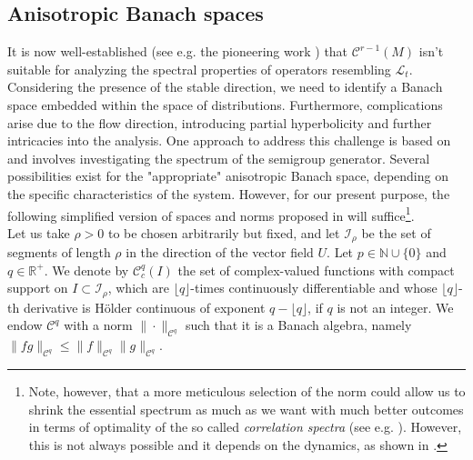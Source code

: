 \documentclass[11pt,letterpaper]{amsart}
\newcommand \cI {{\mathcal I}}
\newcommand \cL {{\mathcal L}}
\newcommand \R {{ \mathbb R}}
\newcommand \N {{ \mathbb N}}
\newcommand \cC {{\mathscr{C}}}
\theoremstyle{definition}
\begin{document}

\subsection{Anisotropic Banach spaces} It is now well-established (see e.g. the pioneering work \cite{BlKeLi}) that $\cC^{r-1}(M)$ isn't suitable for analyzing the spectral properties of operators resembling $ \cL_t$. Considering the presence of the stable direction, we need to identify a Banach space embedded within the space of distributions. Furthermore, complications arise due to the flow direction, introducing partial hyperbolicity and further intricacies into the analysis. One approach to address this challenge is based on \cite{Liv} and involves investigating the spectrum of the semigroup generator. Several possibilities exist for the "appropriate" anisotropic Banach space, depending on the specific characteristics of the system. However, for our present purpose, the following simplified version of spaces and norms proposed in \cite{GoLi} will suffice\footnote{Note, however, that a more meticulous selection of the norm could allow us to shrink the essential spectrum as much as we want with much better outcomes in terms of optimality of the so called {\textit{correlation spectra} (see e.g. \cite{BuLi})}. However, this is not always possible and it depends on the dynamics, as shown in \cite{BuCaCa, BuCaJa, BaCa}.}.\\

%
Let us take $\rho>0$ to be chosen arbitrarily but fixed, and let $\cI_\rho$ be the set of segments of length $\rho$ in the direction of the vector field $U$. Let $p\in \N \cup \{0\}$ and $q\in \R^+$. We denote by $\cC^{q}_c(I)$ the set of complex-valued functions with compact support on $I \subset \cI_\rho$, which are $\lfloor q\rfloor$-times continuously differentiable and whose $\lfloor q\rfloor$-th derivative is H\"older continuous of exponent $q- \lfloor q\rfloor$, if $q$ is not an integer.
We endow $\cC^{q}$ with a norm $\|\cdot \|_{\cC^q}$ such that it is a Banach algebra, namely $\|fg\|_{\cC^q}\le \|f\|_{\cC^q}\|g\|_{\cC^q}$.
\end{document}
